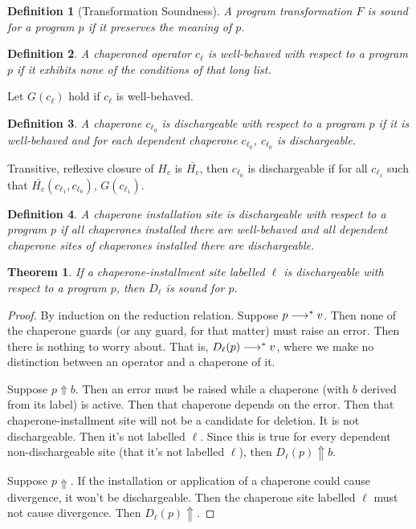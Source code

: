 \documentclass{sigplanconf}
\newtheorem{definition}{Definition}
\newtheorem{theorem}{Theorem}
\begin{document}
\begin{definition}[Transformation Soundness]
A program transformation $F$ is sound for a program $p$ if it preserves the meaning of $p$.
\end{definition}

\begin{definition}
A chaperoned operator $c_\ell$ is \emph{well-behaved} with respect to a program $p$ if it exhibits none of the conditions of that long list.
\end{definition}

Let $G(c_\ell)$ hold if $c_\ell$ is well-behaved.

\begin{definition}
A chaperone $c_{\ell_0}$ is \emph{dischargeable} with respect to a program $p$ if it is well-behaved and for each dependent chaperone $c_{\ell_0}$, $c_{\ell_0}$ is dischargeable.
\end{definition}

Transitive, reflexive closure of $H_c$ is $\bar{H_c}$,
then $c_{\ell_0}$ is dischargeable if for all $c_{\ell_1}$ such that $\bar{H_c}(c_{\ell_1},c_{\ell_0})$, $G(c_{\ell_1})$.

\begin{definition}
A chaperone installation site is \emph{dischargeable} with respect to a program $p$ if all chaperones installed there are well-behaved and all dependent chaperone sites of chaperones installed there are dischargeable.
\end{definition}

\begin{theorem}
If a chaperone-installment site labelled $\ell$ is dischargeable with respect to a program $p$, then $D_\ell$ is sound for $p$.
\end{theorem}

\begin{proof}
By induction on the reduction relation.
Suppose $p\longrightarrow^{*} v$.
Then none of the chaperone guards (or any guard, for that matter) must raise an error.
Then there is nothing to worry about.
That is, $D_\ell(p)\longrightarrow^{*} v$, where we make no distinction between an operator and a chaperone of it.

Suppose $p\Uparrow b$. 
Then an error must be raised while a chaperone (with $b$ derived from its label) is active.
Then that chaperone depends on the error.
Then that chaperone-installment site will not be a candidate for deletion.
It is not dischargeable.
Then it's not labelled $\ell$.
Since this is true for every dependent non-dischargeable site (that it's not labelled $\ell$), then $D_\ell(p)\Uparrow b$.

Suppose $p\Uparrow$.
If the installation or application of a chaperone could cause divergence, it won't be dischargeable.
Then the chaperone site labelled $\ell$ must not cause divergence.
Then $D_\ell(p)\Uparrow$.
\end{proof}
\end{document}
